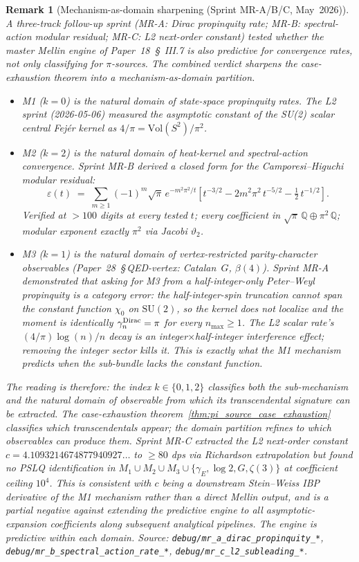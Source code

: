 \documentclass[11pt]{article}
\newtheorem{remark}{Remark}
\begin{document}
\begin{remark}[Mechanism-as-domain sharpening (Sprint MR-A/B/C, May~2026)]
\label{rem:master_mellin_domain}
A three-track follow-up sprint (MR-A: Dirac propinquity rate;
MR-B: spectral-action modular residual; MR-C: L2 next-order
constant) tested whether the master Mellin engine of
Paper~18~\S~III.7 is also \emph{predictive} for convergence rates,
not only classifying for $\pi$-sources. The combined verdict
sharpens the case-exhaustion theorem into a mechanism-as-domain
partition.
\begin{itemize}
\item M1 ($k = 0$) is the natural domain of state-space
propinquity rates. The L2 sprint (2026-05-06) measured the
asymptotic constant of the SU(2) scalar central Fej{\'e}r kernel as
$4/\pi = \mathrm{Vol}(S^2)/\pi^2$.
\item M2 ($k = 2$) is the natural domain of heat-kernel and
spectral-action convergence. Sprint MR-B derived a closed form for
the Camporesi--Higuchi modular residual:
$$
\varepsilon(t) \;=\; \sum_{m \ge 1} (-1)^m \sqrt{\pi}\,
e^{-m^2 \pi^2 / t}\left[t^{-3/2} - 2m^2 \pi^2\, t^{-5/2}
   - \tfrac{1}{2}\, t^{-1/2}\right].
$$
Verified at $> 100$ digits at every tested $t$; every coefficient in
$\sqrt{\pi}\,\mathbb{Q} \oplus \pi^2\,\mathbb{Q}$; modular exponent
exactly $\pi^2$ via Jacobi $\vartheta_2$.
\item M3 ($k = 1$) is the natural domain of vertex-restricted
parity-character observables (Paper~28~\S\,QED-vertex:
Catalan~$G$, $\beta(4)$). Sprint MR-A demonstrated that asking
for M3 from a half-integer-only Peter--Weyl propinquity is a
\emph{category error}: the half-integer-spin truncation cannot span
the constant function $\chi_0$ on $\mathrm{SU}(2)$, so the kernel
does not localize and the moment is identically $\gamma_n^{\rm Dirac}
= \pi$ for every $n_{\max} \ge 1$. The L2 scalar rate's
$(4/\pi)\log(n)/n$ decay is an integer$\times$half-integer
interference effect; removing the integer sector kills it. This is
exactly what the M1 mechanism predicts when the sub-bundle lacks
the constant function.
\end{itemize}
The reading is therefore: the index $k \in \{0, 1, 2\}$ classifies
\emph{both} the sub-mechanism and the natural domain of observable
from which its transcendental signature can be extracted. The
case-exhaustion theorem~\ref{thm:pi_source_case_exhaustion}
classifies \emph{which} transcendentals appear; the domain partition
refines to \emph{which observables} can produce them. Sprint MR-C
extracted the L2 next-order constant $c = 4.1093214674877940927\ldots$
to $\geq 80$ dps via Richardson extrapolation but found no PSLQ
identification in $M_1 \cup M_2 \cup M_3 \cup \{\gamma_E, \log 2,
G, \zeta(3)\}$ at coefficient ceiling $10^4$. This is consistent
with $c$ being a downstream Stein--Weiss IBP derivative of the M1
mechanism rather than a direct Mellin output, and is a partial
negative against extending the predictive engine to all
asymptotic-expansion coefficients along subsequent analytical
pipelines. The engine is predictive \emph{within} each domain.
Source: \texttt{debug/mr\_a\_dirac\_propinquity\_*},
\texttt{debug/mr\_b\_spectral\_action\_rate\_*},
\texttt{debug/mr\_c\_l2\_subleading\_*}.
\end{remark}
\end{document}
